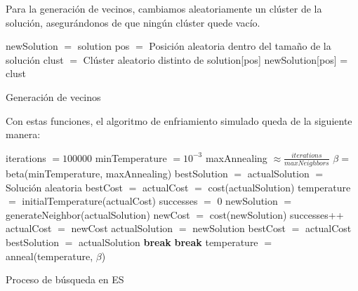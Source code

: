 \vspace{\baselineskip}

Para la generación de vecinos, cambiamos aleatoriamente un clúster de la solución, asegurándonos de que ningún clúster quede vacío.

\vspace{2mm}

\begin{algorithm}[H]
    \SetAlgoLined
         {
            newSolution $=$ solution \;
            pos $=$ Posición aleatoria dentro del tamaño de la solución \;
            clust $=$ Clúster aleatorio distinto de solution[pos] \;
            newSolution[pos] = clust \;
        }
    \caption{Generación de vecinos}
\end{algorithm}

\vspace{\baselineskip}

Con estas funciones, el algoritmo de enfriamiento simulado queda de la siguiente manera:

\vspace{\baselineskip}

\begin{algorithm}[H]
    \SetAlgoLined
        iterations $= 100000$ \;
        minTemperature $= 10^{-3}$ \;
        maxAnnealing $\approx \frac{iterations}{maxNeighbors}$ \;
        $\beta =$ beta(minTemperature, maxAnnealing) \;
        \BlankLine \BlankLine
        bestSolution $=$ actualSolution $=$ Solución aleatoria \;
        bestCost $=$ actualCost $=$ cost(actualSolution) \;
        temperature $=$ initialTemperature(actualCost) \;
        \BlankLine \BlankLine
         {
            successes $=$ $0$ \;
             {
                newSolution $=$ generateNeighbor(actualSolution) \;
                newCost $=$ cost(newSolution) \;
                \BlankLine \BlankLine
                 {
                    successes++ \;
                    actualCost $=$ newCost \;
                    actualSolution $=$ newSolution \;
                    \BlankLine \BlankLine
                     {
                        bestCost $=$ actualCost \;
                        bestSolution $=$ actualSolution \;
                    }
                }
                \BlankLine \BlankLine
                 {
                    \textbf{break} \;
                }
            }
            \BlankLine \BlankLine
             {
                \textbf{break} \;
            }
            \BlankLine \BlankLine
            temperature $=$ anneal(temperature, $\beta$) \;
        }
    \caption{Proceso de búsqueda en ES}
\end{algorithm}

